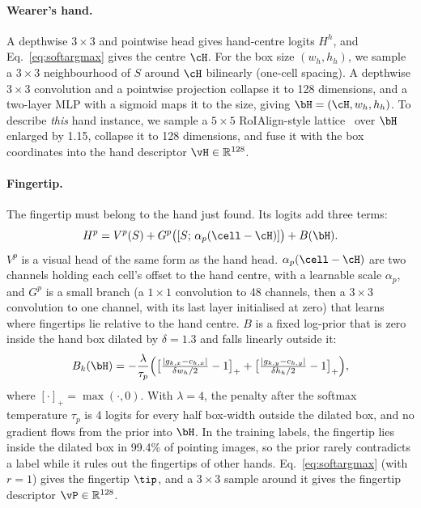 \paragraph{Wearer's hand.} A depthwise $3\times3$ and pointwise head gives hand-centre logits $H^h$, and Eq.~\eqref{eq:softargmax} gives the centre $\cH$. For the box size $(w_h,h_h)$, we sample a $3\times3$ neighbourhood of $S$ around $\cH$ bilinearly (one-cell spacing). A depthwise $3\times3$ convolution and a pointwise projection collapse it to 128 dimensions, and a two-layer MLP with a sigmoid maps it to the size, giving $\bH=(\cH,w_h,h_h)$. To describe \emph{this} hand instance, we sample a $5\times5$ RoIAlign-style lattice~\cite{he2017mask} over $\bH$ enlarged by 1.15, collapse it to 128 dimensions, and fuse it with the box coordinates into the hand descriptor $\vH\in\mathbb{R}^{128}$.

\paragraph{Fingertip.} The fingertip must belong to the hand just found. Its logits add three terms:
\begin{equation}
H^p = V^p(S) + G^p\big([S;\,\alpha_p(\cell-\cH)]\big) + B(\bH).
\label{eq:tip}
\end{equation}
$V^p$ is a visual head of the same form as the hand head. $\alpha_p(\cell-\cH)$ are two channels holding each cell's offset to the hand centre, with a learnable scale $\alpha_p$, and $G^p$ is a small branch (a $1\times1$ convolution to 48 channels, then a $3\times3$ convolution to one channel, with its last layer initialised at zero) that learns where fingertips lie relative to the hand centre. $B$ is a fixed log-prior that is zero inside the hand box dilated by $\delta{=}1.3$ and falls linearly outside it:
\begin{equation}
B_k(\bH) = -\frac{\lambda}{\tau_p}\Big(\big[\tfrac{|g_{k,x}-c_{h,x}|}{\delta w_h/2}-1\big]_+ + \big[\tfrac{|g_{k,y}-c_{h,y}|}{\delta h_h/2}-1\big]_+\Big),
\end{equation}
where $[\cdot]_+=\max(\cdot,0)$. With $\lambda{=}4$, the penalty after the softmax temperature $\tau_p$ is 4 logits for every half box-width outside the dilated box, and no gradient flows from the prior into $\bH$. In the training labels, the fingertip lies inside the dilated box in 99.4\% of pointing images, so the prior rarely contradicts a label while it rules out the fingertips of other hands. Eq.~\eqref{eq:softargmax} (with $r{=}1$) gives the fingertip $\tip$, and a $3\times3$ sample around it gives the fingertip descriptor $\vP\in\mathbb{R}^{128}$.

